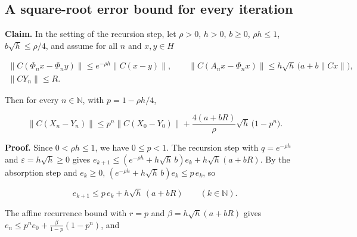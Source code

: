 \documentclass[11pt,a4paper]{report}
\begin{document}
\subsection{\texorpdfstring{A square-root error bound for every iteration}{A square-root error bound for every iteration}}


\textbf{Claim.} In the setting of the recursion step, let \(\rho>0\), \(h>0\), \(b\ge0\), \(\rho h\le1\), \(b\sqrt h\le\rho/4\), and assume for all \(n\) and \(x,y\in H\)


\[\begin{gathered}\|C(\Phi_nx-\Phi_ny)\|\le e^{-\rho h}\|C(x-y)\|,\qquad\|C(A_nx-\Phi_nx)\|\le h\sqrt h\,\bigl(a+b\|Cx\|\bigr),\\ \|CY_n\|\le R .\end{gathered}\]


Then for every \(n\in\mathbb N\), with \(p=1-\rho h/4\),


\[\|C(X_n-Y_n)\|\le p^n\|C(X_0-Y_0)\|+\frac{4(a+bR)}{\rho}\sqrt h\,\bigl(1-p^n\bigr).\]


\textbf{Proof.} Since \(0<\rho h\le1\), we have \(0\le p<1\). The recursion step with \(q=e^{-\rho h}\) and \(\varepsilon=h\sqrt h\ge0\) gives \(e_{k+1}\le(e^{-\rho h}+h\sqrt h\,b)e_k+h\sqrt h(a+bR)\). By the absorption step and \(e_k\ge0\), \((e^{-\rho h}+h\sqrt h\,b)e_k\le p\,e_k\), so


\[e_{k+1}\le p\,e_k+h\sqrt h\,(a+bR)\qquad(k\in\mathbb N).\]


The affine recurrence bound with \(r=p\) and \(\beta=h\sqrt h(a+bR)\) gives \(e_n\le p^ne_0+\frac{\beta}{1-p}(1-p^n)\), and
\end{document}

